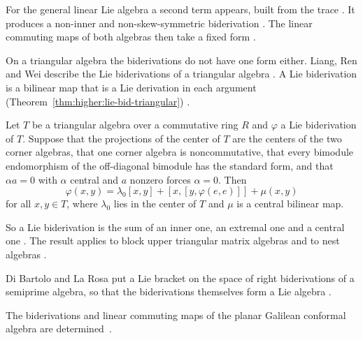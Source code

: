 For the general linear Lie algebra a second term appears, built from the trace
\cite[Theorem~3.2, p.~8]{Tang2017Biderivations}. It produces a non-inner and non-skew-symmetric
biderivation \cite[p.~1]{Tang2017Biderivations}. The linear commuting maps of both algebras
then take a fixed form \cite[Theorems~3.4 and~3.5, p.~9]{Tang2017Biderivations}.

On a triangular algebra the biderivations do not have one form either. Liang, Ren
and Wei describe the Lie biderivations of a triangular algebra
\cite[p.~1]{LiangRenWei2020}. A Lie biderivation is a bilinear map that is a Lie
derivation in each argument (Theorem~\ref{thm:higher:lie-bid-triangular}) \cite[p.~1]{LiangRenWei2020}.

\begin{theorem}\label{thm:higher:lie-bid-triangular}
Let $T$ be a triangular algebra over a commutative ring $R$ and $\varphi$ a Lie
biderivation of $T$. Suppose that the projections of the center of $T$ are the
centers of the two corner algebras, that one corner algebra is noncommutative,
that every bimodule endomorphism of the off-diagonal bimodule has the standard
form, and that $\alpha a=0$ with $\alpha$ central and $a$ nonzero forces
$\alpha=0$. Then
\[
\varphi(x,y)=\lambda_{0}[x,y]+[x,[y,\varphi(e,e)]]+\mu(x,y)
\]
for all $x,y\in T$, where $\lambda_{0}$ lies in the center of $T$ and $\mu$ is a
central bilinear map.
\end{theorem}

So a Lie biderivation is the sum of an inner one, an extremal one and a central
one \cite[p.~1]{LiangRenWei2020}. The result applies to block upper triangular
matrix algebras and to nest algebras
\cite[Corollaries~3.8 and~3.9, p.~14]{LiangRenWei2020}.

Di Bartolo and La Rosa put a Lie bracket on the space of right biderivations
of a semiprime algebra, so that the biderivations themselves form a Lie algebra
\cite[Abstract, p.~1]{DiBartoloLaRosa2026}.

The biderivations and linear commuting maps of the planar Galilean conformal algebra are determined~\cite{WlBiderivationsAndLinearCommutin2020}.
